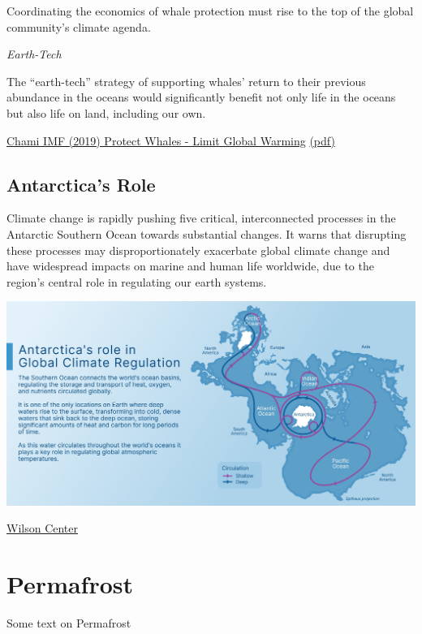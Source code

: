 \documentclass[
]{book}
\begin{document}
Coordinating the economics of whale protection must rise to the top of the global community's climate agenda.

\emph{Earth-Tech}

The ``earth-tech'' strategy of supporting whales' return to their previous abundance in the oceans would significantly benefit not only life in the oceans but also life on land, including our own.

\href{https://www.imf.org/external/pubs/ft/fandd/2019/12/natures-solution-to-climate-change-chami.htm}{Chami IMF (2019) Protect Whales - Limit Global Warming}
\href{pdf/Chami_2021_Whale_Pump.pdf}{(pdf)}

\hypertarget{antarcticas-role}{%
\section{Antarctica's Role}\label{antarcticas-role}}

Climate change is rapidly pushing five critical, interconnected processes in the Antarctic Southern Ocean towards substantial changes. It warns that disrupting these processes may disproportionately exacerbate global climate change and have widespread impacts on marine and human life worldwide, due to the region's central role in regulating our earth systems.

\includegraphics{fig/Antarctica_Circulation.jpeg}

\href{https://www.wilsoncenter.org/publication/polar-perspectives-no-5-climate-change-and-southern-ocean-resilience}{Wilson Center}

\hypertarget{permafrost}{%
\chapter{Permafrost}\label{permafrost}}

Some text on Permafrost
\end{document}
